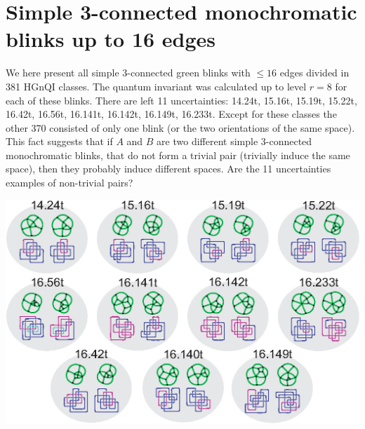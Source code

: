 \chapter{Simple 3-connected monochromatic blinks up to 16 edges}
\label{chap:catalolgue3con}

We here present all simple 3-connected green blinks with
$\leq 16$ edges divided in 381 HGnQI classes. The quantum
invariant was calculated up to level $r=8$ for each of
these blinks. There are left 11 uncertainties: 14.24t,
15.16t, 15.19t, 15.22t, 16.42t, 16.56t, 16.141t, 16.142t,
16.149t, 16.233t. Except for these classes the other 370
consisted of only one blink (or the two orientations of
the same space). This fact suggests that if $A$ and $B$
are two different simple 3-connected monochromatic blinks,
that do not form a trivial pair (trivially induce the
same space), then they probably induce different spaces.
Are the 11 uncertainties examples of non-trivial pairs?

\begin{center}
\includegraphics{fig/doubts3ConnectedIsolated.eps}
\end{center}

\newcount\ii \newcount\jj   %
\def\producePagesThree#1#2{
\ii=#1                      %
\jj=#2                      %
\advance\jj by 1            %
\loop   %
   \ifnum\ii<\jj
{
   \hspace{-1.8cm}
   \enlargethispage{5cm}
   {\centering
   \texttt{[image: fig/con3Catalog\\ifnum\\ii<100 0\\fi\\ifnum\\ii<10 0\\fi\\number\\ii.eps]}
   }
   \newpage}
      \advance\ii by 1
   \repeat
}

